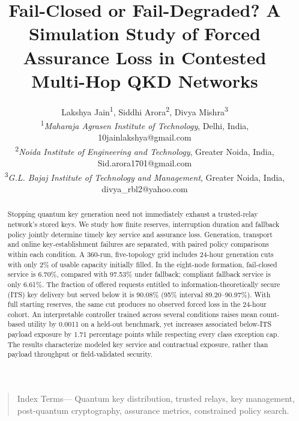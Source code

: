 \documentclass[conference,a4paper]{IEEEtran}
\newcommand{\MainClosed}{6.70}
\newcommand{\MainDegraded}{97.53}
\newcommand{\MainQualified}{6.61}
\newcommand{\MainForced}{90.08}
\newcommand{\MainForcedLo}{89.20}
\newcommand{\MainForcedHi}{90.97}
\newcommand{\LearnUtilityDelta}{0.0011}
\newcommand{\LearnPayloadDelta}{1.71}
\newcommand{\IEEEauthorblockN}[1]{#1\\}
\newcommand{\IEEEauthorblockA}[1]{#1}
\newcommand{\IEEEauthorrefmark}[1]{\textsuperscript{#1}}
\begin{document}
\title{Fail-Closed or Fail-Degraded? A Simulation Study of Forced Assurance Loss in Contested Multi-Hop QKD Networks}
\author{
\IEEEauthorblockN{Lakshya Jain\IEEEauthorrefmark{1}, Siddhi Arora\IEEEauthorrefmark{2}, Divya Mishra\IEEEauthorrefmark{3}}
\IEEEauthorblockA{\IEEEauthorrefmark{1}\textit{Maharaja Agrasen Institute of Technology}, Delhi, India, 10jainlakshya@gmail.com\\
\IEEEauthorrefmark{2}\textit{Noida Institute of Engineering and Technology}, Greater Noida, India, Sid.arora1701@gmail.com\\
\IEEEauthorrefmark{3}\textit{G.L. Bajaj Institute of Technology and Management}, Greater Noida, India, divya\_rbl2@yahoo.com}}
\maketitle

\begin{abstract}
Stopping quantum key generation need not immediately exhaust a trusted-relay network's stored keys. We study how finite reserves, interruption duration and fallback policy jointly determine timely key service and assurance loss. Generation, transport and online key-establishment failures are separated, with paired policy comparisons within each condition. A 360-run, five-topology grid includes 24-hour generation cuts with only 2\% of usable capacity initially filled. In the eight-node formation, fail-closed service is \MainClosed\%, compared with \MainDegraded\% under fallback; compliant fallback service is only \MainQualified\%. The fraction of offered requests entitled to information-theoretically secure (ITS) key delivery but served below it is \MainForced\% (95\% interval \MainForcedLo--\MainForcedHi\%). With full starting reserves, the same cut produces no observed forced loss in the 24-hour cohort. An interpretable controller trained across several conditions raises mean count-based utility by \LearnUtilityDelta{} on a held-out benchmark, yet increases associated below-ITS payload exposure by \LearnPayloadDelta{} percentage points while respecting every class exception cap. The results characterize modeled key service and contractual exposure, rather than payload throughput or field-validated security.
\end{abstract}
\begin{quote}Index Terms---
Quantum key distribution, trusted relays, key management, post-quantum cryptography, assurance metrics, constrained policy search.
\end{quote}
\end{document}
